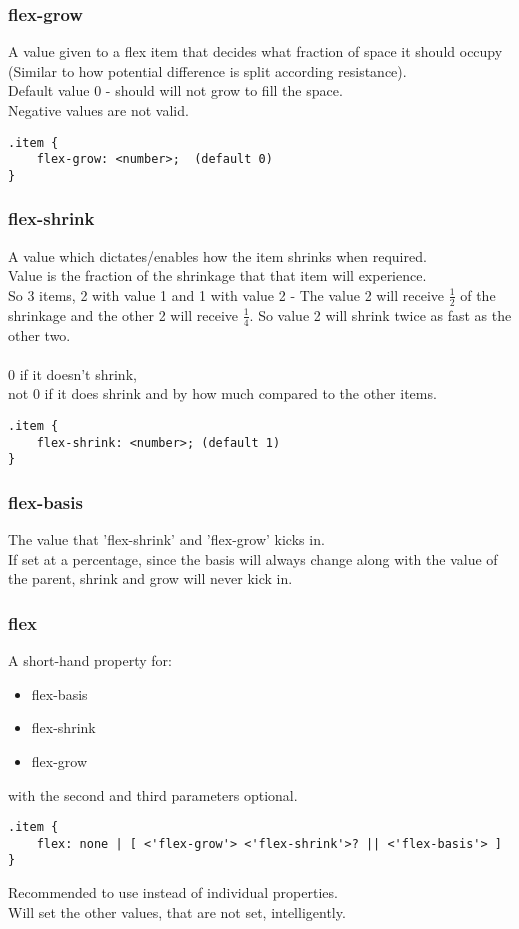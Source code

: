 \documentclass[]{article}
\begin{document}
\subsubsection{flex-grow}
A value given to a flex item that decides what fraction of space it should occupy (Similar to how potential difference is split according resistance).
\\
Default value 0 - should will not grow to fill the space.
\\
Negative values are not valid.
\begin{lstlisting}
.item {
	flex-grow: <number>;  (default 0) 
}
\end{lstlisting}

\subsubsection{flex-shrink}
A value which dictates/enables how the item shrinks when required.
\\
Value is the fraction of the shrinkage that that item will experience.
\\
So 3 items, 2 with value 1 and 1 with value 2 - The value 2 will receive $\frac{1}{2}$ of the shrinkage and the other 2 will receive $\frac{1}{4}$.  So value 2 will shrink twice as fast as the other two.
\\\\
0 if it doesn't shrink, \\
not 0 if it does shrink and by how much compared to the other items.
\begin{lstlisting}
.item {
	flex-shrink: <number>; (default 1)
}
\end{lstlisting}

\subsubsection{flex-basis}
The value that 'flex-shrink' and 'flex-grow' kicks in.
\\
If set at a percentage, since the basis will always change along with the value of the parent, shrink and grow will never kick in.

\subsubsection{flex}
A short-hand property for:
\begin{itemize}
	\item flex-basis
	\item flex-shrink
	\item flex-grow
\end{itemize}
with the second and third parameters optional.
\begin{lstlisting}
.item {
	flex: none | [ <'flex-grow'> <'flex-shrink'>? || <'flex-basis'> ]
}
\end{lstlisting}
Recommended to use instead of individual properties.
\\
Will set the other values, that are not set, intelligently.
\end{document}
